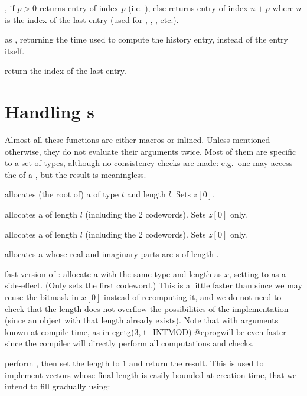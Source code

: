 , if $p>0$ returns entry of index $p$
(i.e. ), else returns entry of index $n+p$ where $n$ is the
index of the last entry (used for \kbd{\%}, , , etc.).

 as ,
returning the time used to compute the history entry, instead of the entry
itself.

 return the index of the last entry.

\section{Handling s}
\noindent Almost all these functions are either macros or inlined. Unless
mentioned otherwise, they do not evaluate their arguments twice. Most of them
are specific to a set of types, although no consistency checks are made:
e.g.~one may access the  of a , but the result is
meaningless.


 allocates (the root of) a 
of type $t$ and length $l$. Sets $z[0]$.

 allocates a  of length $l$ (including the
2 codewords). Sets $z[0]$ only.

 allocates a  of length $l$ (including the
2 codewords). Sets $z[0]$ only.

 allocates a  whose real and
imaginary parts are s of length .

 fast version of :
allocate a  with the same type and length as $x$, setting 
to  as a side-effect. (Only sets the first codeword.) This is
a little faster than  since we may reuse the bitmask in
$x[0]$ instead of recomputing it, and we do not need to check that the
length does not overflow the possibilities of the
implementation (since an object with that length already exists). Note that
 with arguments known at compile time, as in
\bprog
  cgetg(3, t_INTMOD)
@eprog\noindent will be even faster since the compiler will directly perform
all computations and checks.

 perform , then
set the length to $1$ and return the result. This is used to  implement
vectors whose final length is easily bounded at creation time, that we intend
to fill gradually using:

